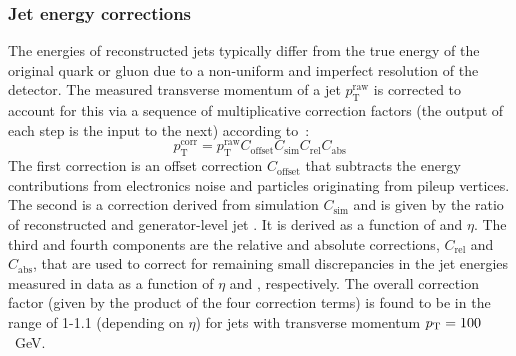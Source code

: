 \subsubsection{Jet energy corrections}
\label{sec:detector-jecs}
The energies of reconstructed jets typically differ from the true energy of the 
original quark or gluon due to a non-uniform and imperfect resolution of the 
detector. The measured transverse momentum of a jet 
$p_{\mathrm{T}}^{\mathrm{raw}}$ is corrected to account for this via a sequence 
of multiplicative correction factors (the output of each step is the input to 
the next) according to~\cite{jec}:
\begin{equation}
p_{\mathrm{T}}^{\mathrm{corr}} =  p_{\mathrm{T}}^{\mathrm{raw}} 
C_{\mathrm{offset}} C_{\mathrm{sim}} C_{\mathrm{rel}} C_{\mathrm{abs}} 
\end{equation}
The first correction is an offset correction $C_{\mathrm{offset}}$ that 
subtracts the energy contributions from electronics noise and particles 
originating from pileup vertices. 
The second is a correction derived from simulation $C_{\mathrm{sim}}$ and is 
given by the ratio of reconstructed and generator-level jet \pt. It is derived 
as a function of \pt and $\eta$. 
The third and fourth components are the relative and absolute corrections, 
$C_{\mathrm{rel}}$ and $C_{\mathrm{abs}}$, that are used to correct for 
remaining small discrepancies in the jet energies measured in data as a 
function of $\eta$ and \pt, respectively. 
The overall correction factor (given by the product of the four correction 
terms) is found to be in the range of 1-1.1 (depending on $\eta$) for jets with 
transverse momentum ${p_{\text T}}=100$~GeV.

